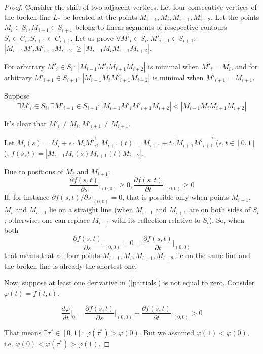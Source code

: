 \documentclass[]{llncs}
\begin{document}
\begin{proof}
Consider the shift of two adjacent vertices.
Let four consecutive vertices of the broken line
$L_*$
be located at the points
$M_{i-1}, M_i, M_{i+1}, M_{i+2}$.
Let the points
$M_i \in S_i,
M_{i+1} \in S_{i+1}$
belong to linear segments
of rescpective contours
$S_i \subset C_i,
S_{i+1} \subset C_{i+1}$.
Let us prove
$
\forall M'_i \in S_i,
M'_{i+1} \in S_{i+1}
$:
$
|M_{i-1} M'_i M'_{i+1} M_{i+2}|
\ge
|M_{i-1} M_i M_{i+1} M_{i+2}|
$.

For arbitrary
$M'_i \in S_i$:
$|M_{i-1} M'_i M_{i+1} M_{i+2}|$
is minimal when $M'_i=M_i$,
and
for arbitrary
$M'_{i+1} \in S_{i+1}$:
$|M_{i-1} M_i M'_{i+1} M_{i+2}|$
is minimal when $M'_{i+1}=M_{i+1}$.

Suppose
$$
\exists M'_i \in S_i,
\exists M'_{i+1} \in S_{i+1}
:
|M_{i-1} M'_i M'_{i+1} M_{i+2}|
<
|M_{i-1} M_i M_{i+1} M_{i+2}|
$$

It's clear that
$
M'_i \ne M_i,
M'_{i+1} \ne M_{i+1}
$.

Let
$
M_i(s)=M_i+s \cdot \overrightarrow{M_i M'_i}
$,
$
 M_{i+1}(t)= M_{i+1}+t \cdot \overrightarrow{M_{i+1} M'_{i+1}}
$
($s,t \in[0,1]$),
$f(s,t)=
|M_{i-1} M_i(s) M_{i+1}(t) M_{i+2}|
$.

Due to positions of
$M_i$ and $M_{i+1}$:
\begin{equation}
\frac{\partial f(s,t)}{\partial s} \Big|_{(0,0)} \ge 0,
\frac{\partial f(s,t)}{\partial t} \Big|_{(0,0)} \ge 0
\label{partials}
\end{equation}
If,
for instance
$\partial f(s,t) / \partial s \big|_{(0,0)} = 0$,
that is possible only
when
points
$M_{i-1}$, $M_i$ and $M_{i+1}$
lie on a straight line
(when $M_{i-1}$ and $M_{i+1}$
are on both sides of
$S_i$;
otherwise,
one can replace
$M_{i-1}$ with its reflection
relative to
$S_i$).
So, when both
$$
\frac{\partial f(s,t)}{\partial s} \Big|_{(0,0)}
= 0 =
\frac{\partial f(s,t)}{\partial t} \Big|_{(0,0)}
$$
that means that all four points
$M_{i-1}, M_i, M_{i+1}, M_{i+2}$
lie on the same line
and the broken line is already
the shortest one.

Now,
suppose
at least one derivative in
(\ref{partials})
is not equal to zero.
Consider
$\varphi(t)=f(t,t)$.

$$
\frac{d\varphi}{dt} \Big|_0 =
\frac{\partial f(s,t)}{\partial s} \Big|_{(0,0)}
+
\frac{\partial f(s,t)}{\partial t} \Big|_{(0,0)}
>0
$$

That means
$\exists \tau^* \in [0,1]$:
$\varphi(\tau^*) > \varphi(0)$.
But we assumed
$\varphi(1)<\varphi(0)$,
i.e.
$\varphi(0)<\varphi(\tau^*)>\varphi(1)$.


\end{proof}
\end{document}
